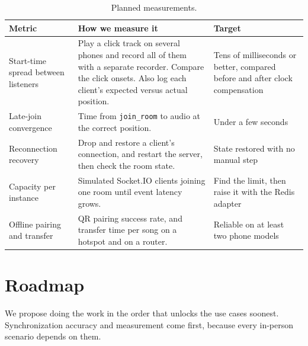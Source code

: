 \documentclass[11pt,a4paper]{article}
\begin{document}
\begin{table}[htbp]
\centering
\caption{Planned measurements.}
\label{tab:eval}
\footnotesize
\begin{tabularx}{\textwidth}{@{}>{\raggedright\arraybackslash}p{3.6cm}>{\raggedright\arraybackslash}X>{\raggedright\arraybackslash}p{3.2cm}@{}}
\toprule
\textbf{Metric} & \textbf{How we measure it} & \textbf{Target} \\
\midrule
Start-time spread between listeners & Play a click track on several phones and record all of them with a separate recorder. Compare the click onsets. Also log each client's expected versus actual position. & Tens of milliseconds or better, compared before and after clock compensation \\
Late-join convergence & Time from \texttt{join\_room} to audio at the correct position. & Under a few seconds \\
Reconnection recovery & Drop and restore a client's connection, and restart the server, then check the room state. & State restored with no manual step \\
Capacity per instance & Simulated Socket.IO clients joining one room until event latency grows. & Find the limit, then raise it with the Redis adapter \\
Offline pairing and transfer & QR pairing success rate, and transfer time per song on a hotspot and on a router. & Reliable on at least two phone models \\
\bottomrule
\end{tabularx}
\end{table}

\section{Roadmap}\label{sec:roadmap}
We propose doing the work in the order that unlocks the use cases soonest. Synchronization
accuracy and measurement come first, because every in-person scenario depends on them.
\end{document}
